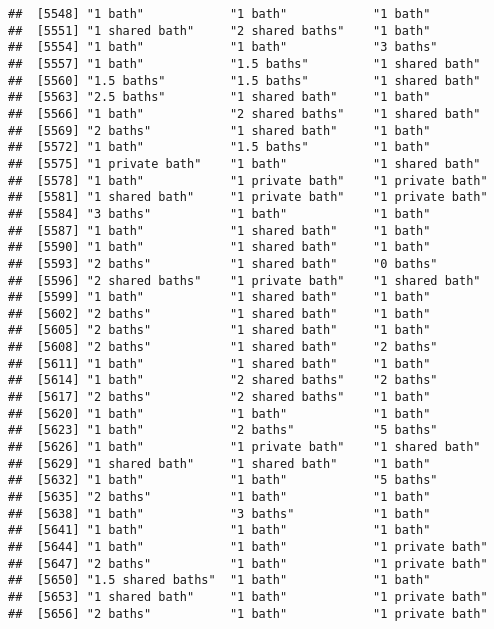 \documentclass[
]{article}
\begin{document}
\begin{verbatim}
##  [5548] "1 bath"            "1 bath"            "1 bath"           
##  [5551] "1 shared bath"     "2 shared baths"    "1 bath"           
##  [5554] "1 bath"            "1 bath"            "3 baths"          
##  [5557] "1 bath"            "1.5 baths"         "1 shared bath"    
##  [5560] "1.5 baths"         "1.5 baths"         "1 shared bath"    
##  [5563] "2.5 baths"         "1 shared bath"     "1 bath"           
##  [5566] "1 bath"            "2 shared baths"    "1 shared bath"    
##  [5569] "2 baths"           "1 shared bath"     "1 bath"           
##  [5572] "1 bath"            "1.5 baths"         "1 bath"           
##  [5575] "1 private bath"    "1 bath"            "1 shared bath"    
##  [5578] "1 bath"            "1 private bath"    "1 private bath"   
##  [5581] "1 shared bath"     "1 private bath"    "1 private bath"   
##  [5584] "3 baths"           "1 bath"            "1 bath"           
##  [5587] "1 bath"            "1 shared bath"     "1 bath"           
##  [5590] "1 bath"            "1 shared bath"     "1 bath"           
##  [5593] "2 baths"           "1 shared bath"     "0 baths"          
##  [5596] "2 shared baths"    "1 private bath"    "1 shared bath"    
##  [5599] "1 bath"            "1 shared bath"     "1 bath"           
##  [5602] "2 baths"           "1 shared bath"     "1 bath"           
##  [5605] "2 baths"           "1 shared bath"     "1 bath"           
##  [5608] "2 baths"           "1 shared bath"     "2 baths"          
##  [5611] "1 bath"            "1 shared bath"     "1 bath"           
##  [5614] "1 bath"            "2 shared baths"    "2 baths"          
##  [5617] "2 baths"           "2 shared baths"    "1 bath"           
##  [5620] "1 bath"            "1 bath"            "1 bath"           
##  [5623] "1 bath"            "2 baths"           "5 baths"          
##  [5626] "1 bath"            "1 private bath"    "1 shared bath"    
##  [5629] "1 shared bath"     "1 shared bath"     "1 bath"           
##  [5632] "1 bath"            "1 bath"            "5 baths"          
##  [5635] "2 baths"           "1 bath"            "1 bath"           
##  [5638] "1 bath"            "3 baths"           "1 bath"           
##  [5641] "1 bath"            "1 bath"            "1 bath"           
##  [5644] "1 bath"            "1 bath"            "1 private bath"   
##  [5647] "2 baths"           "1 bath"            "1 private bath"   
##  [5650] "1.5 shared baths"  "1 bath"            "1 bath"           
##  [5653] "1 shared bath"     "1 bath"            "1 private bath"   
##  [5656] "2 baths"           "1 bath"            "1 private bath"   

\end{verbatim}
\end{document}
